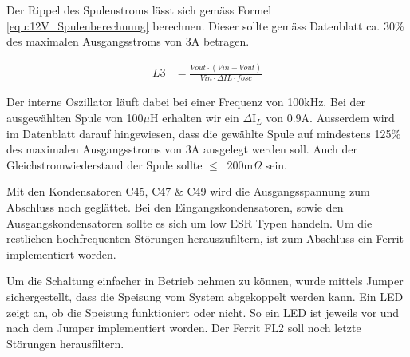 Der Rippel des Spulenstroms lässt sich gemäss Formel \ref{equ:12V_Spulenberechnung} berechnen. Dieser sollte gemäss Datenblatt ca. 30\% des maximalen Ausgangsstroms von 3A betragen. \cite[S.10]{monolithic_power_systems_mp24943_2011}

\begin{align}
L3 &= \frac{Vout \cdot (Vin-Vout)}{Vin \cdot \Delta IL \cdot fosc}
\label{equ:12V_Spulenberechnung}
\end{align}

Der interne Oszillator läuft dabei bei einer Frequenz von 100kHz. Bei der ausgewählten Spule von 100$\mu$H erhalten wir ein $\Delta$I$_{L}$ von 0.9A. Ausserdem wird im Datenblatt darauf hingewiesen, dass die gewählte Spule auf mindestens 125\% des maximalen Ausgangsstroms von 3A ausgelegt werden soll. Auch der Gleichstromwiederstand der Spule sollte $ \leq \ $ 200m$\Omega$  sein.\cite[S.8]{monolithic_power_systems_mp24943_2011}  \cite[S.10]{monolithic_power_systems_mp24943_2011}

Mit den Kondensatoren C45, C47 \& C49 wird die Ausgangsspannung zum Abschluss noch geglättet. Bei den Eingangskondensatoren, sowie den Ausgangskondensatoren sollte es sich um low ESR Typen handeln. Um die restlichen hochfrequenten Störungen herauszufiltern, ist zum Abschluss ein Ferrit implementiert worden. 

Um die Schaltung einfacher in Betrieb nehmen zu können, wurde mittels Jumper sichergestellt, dass die Speisung vom System abgekoppelt werden kann. Ein LED zeigt an, ob die Speisung funktioniert oder nicht. So ein LED ist jeweils vor und nach dem Jumper implementiert worden. Der Ferrit FL2 soll noch letzte Störungen herausfiltern.

